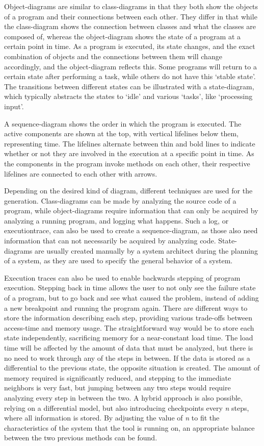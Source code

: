 Object-diagrams are similar to class-diagrams in that they both show the objects of a program and their connections between each other.
They differ in that while the class-diagram shows the connection between classes and what the classes are composed of, whereas the object-diagram shows the state of a program at a certain point in time.
As a program is executed, its state changes, and the exact combination of objects and the connections between them will change accordingly, and the object-diagram reflects this.
Some programs will return to a certain state after performing a task, while others do not have this `stable state'.
The transitions between different states can be illustrated with a state-diagram, which typically abstracts the states to `idle' and various `tasks', like `processing input'.

A sequence-diagram shows the order in which the program is executed.
The active components are shown at the top, with vertical \glspl{lifeline} below them, representing time.
The lifelines alternate between thin and bold lines to indicate whether or not they are involved in the execution at a specific point in time.
As the components in the program invoke methods on each other, their respective lifelines are connected to each other with arrows.

Depending on the desired kind of diagram, different techniques are used for the generation.
Class-diagrams can be made by analyzing the source code of a program, while object-diagrams require information that can only be acquired by analyzing a running program, and logging what happens.
Such a log, or \gls{executiontrace}, can also be used to create a sequence-diagram, as those also need information that can not necessarily be acquired by analyzing code.
State-diagrams are usually created manually by a system architect during the planning of a system, as they are used to specify the general behavior of a system.

Execution traces can also be used to enable backwards stepping of program execution.
Stepping back in time allows the user to not only see the failure state of a program, but to go back and see what caused the problem, instead of adding a new \gls{breakpoint} and running the program again.
There are different ways to store the information describing each step, providing various trade-offs between access-time and memory usage.
The straightforward way would be to store each state independently, sacrificing memory for a near-constant load time.
The load time will be affected by the amount of data that must be analyzed, but there is no need to work through any of the steps in between.
If the data is stored as a differential to the previous state, the opposite situation is created.
The amount of memory required is significantly reduced, and stepping to the immediate neighbors is very fast, but jumping between any two steps would require analyzing every step in between the two.
A hybrid approach is also possible, relying on a differential model, but also introducing checkpoints every \textit{n} steps, where all information is stored.
By adjusting the value of \textit{n} to fit the characteristics of the system that the tool is running on, an appropriate balance between the two previous methods can be found.


